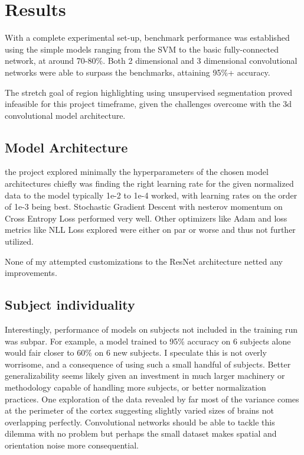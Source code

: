 \section{Results}\label{sec:results}

With a complete experimental set-up, benchmark performance was established using the simple models ranging from the
SVM to the basic fully-connected network, at around 70-80\%.
Both 2 dimensional and 3 dimensional convolutional networks were able to surpass the benchmarks,
attaining 95\%+ accuracy.

The stretch goal of region highlighting using unsupervised segmentation proved infeasible for this project timeframe, given
the challenges overcome with the 3d convolutional model architecture.

\subsection{Model Architecture}\label{subsec:model-arch}

the project explored minimally the hyperparameters of the chosen model architectures
chiefly was finding the right learning rate for the given normalized data to the model
typically 1e-2 to 1e-4 worked, with learning rates on the order of 1e-3 being best.
Stochastic Gradient Descent with nesterov momentum on Cross Entropy Loss performed very well.
Other optimizers like Adam and loss metrics like NLL Loss explored were either on par or worse and thus not
further utilized.

None of my attempted customizations to the ResNet architecture netted any improvements.

\subsection{Subject individuality}\label{subsec:subjects-individ}

Interestingly, performance of models on subjects not included in the training run was subpar.
For example, a model trained to 95\% accuracy on 6 subjects alone would fair closer to 60\% on 6 new subjects.
I speculate this is not overly worrisome, and a consequence of using such a small handful of subjects.
Better generalizability seems likely given an investment in much larger machinery or methodology capable of handling
more subjects, or better normalization practices.
One exploration of the data revealed by far most of the variance comes at the perimeter of the cortex suggesting slightly
varied sizes of brains not overlapping perfectly.
Convolutional networks should be able to tackle this dilemma with no problem but perhaps the small dataset makes
spatial and orientation noise more consequential.

